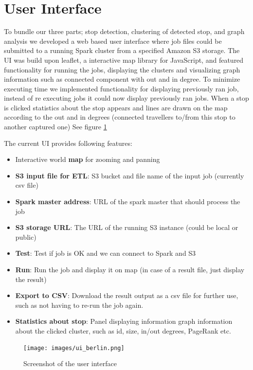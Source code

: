 \section{User Interface}
To bundle our three parts; stop detection, clustering of detected stop, and graph analysis we developed a web based user interface where job files could be submitted to a running Spark cluster from a specified Amazon S3 storage. The UI was build upon leaflet\cite{leaflet}, a interactive map library for JavaScript, and featured functionality for running the jobs, displaying  the clusters and visualizing graph information such as connected component with out and in degree. To minimize executing time we implemented functionality for displaying previously ran job, instead of re executing jobs it could now display previously ran jobs. When a stop is clicked statistics about the stop appears and lines are drawn on the map according to the out and in degrees (connected travellers to/from this stop to another captured one) See figure \ref{fig:ui_berlin}

The current UI provides following features:
\begin{itemize}
  \item Interactive world \textbf{map} for zooming and panning
  \item \textbf{S3 input file for ETL}: S3 bucket and file name of the input job (currently csv file)  
  \item \textbf{Spark master address}: URL of the spark master that should process the job
  \item \textbf{S3 storage URL}: The URL of the running S3 instance (could be local or public)
  \item \textbf{Test}: Test if job is OK and we can connect to Spark and S3
  \item \textbf{Run}: Run the job and display it on map (in case of a result file, just display the result)
  \item \textbf{Export to CSV}: Download the result output as a csv file for further use, such as not having to re-run the job again. 
  \item \textbf{Statistics about stop}: Panel displaying information  graph information about the clicked cluster, such as id, size, in/out degrees, PageRank etc. 
\end{itemize}

\begin{figure}[!ht]
	\centering
	\texttt{[image: images/ui\_berlin.png]}\\
	\caption{ Screenshot of the user interface }
	\label{fig:ui_berlin}
\end{figure}
\FloatBarrier
